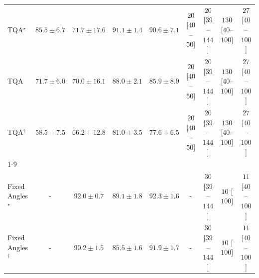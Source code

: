 \begin{tabular}{l|cccc|cccc|}
TQA$^\star$ & {\cellcolor[HTML]{C84A02}} \color[HTML]{F1F1F1} $85.5\pm 6.7$ & {\cellcolor[HTML]{FEA937}} \color[HTML]{000000} $71.7\pm 17.6$ & {\cellcolor[HTML]{963304}} \color[HTML]{F1F1F1} $91.1\pm 1.4$ & {\cellcolor[HTML]{9B3504}} \color[HTML]{F1F1F1} $90.6\pm 7.1$ & {\cellcolor[HTML]{FFF4F0}} \color[HTML]{000000} $20$ [$40$--$50$] & {\cellcolor[HTML]{FFF4F0}} \color[HTML]{000000} $20$ [$39$--$144$] & {\cellcolor[HTML]{FDD9D6}} \color[HTML]{000000} $130$ [$40$--$100$] & {\cellcolor[HTML]{FFF3EF}} \color[HTML]{000000} $27$ [$40$--$100$] \\
TQA & {\cellcolor[HTML]{FEA937}} \color[HTML]{000000} $71.7\pm 6.0$ & {\cellcolor[HTML]{FEB541}} \color[HTML]{000000} $70.0\pm 16.1$ & {\cellcolor[HTML]{B13F03}} \color[HTML]{F1F1F1} $88.0\pm 2.1$ & {\cellcolor[HTML]{C44802}} \color[HTML]{F1F1F1} $85.9\pm 8.9$ & {\cellcolor[HTML]{FFF4F0}} \color[HTML]{000000} $20$ [$40$--$50$] & {\cellcolor[HTML]{FFF4F0}} \color[HTML]{000000} $20$ [$39$--$144$] & {\cellcolor[HTML]{FDD9D6}} \color[HTML]{000000} $130$ [$40$--$100$] & {\cellcolor[HTML]{FFF3EF}} \color[HTML]{000000} $27$ [$40$--$100$] \\
TQA$^\dagger$ & {\cellcolor[HTML]{FFF1AE}} \color[HTML]{000000} $58.5\pm 7.5$ & {\cellcolor[HTML]{FECE65}} \color[HTML]{000000} $66.2\pm 12.8$ & {\cellcolor[HTML]{E3660F}} \color[HTML]{F1F1F1} $81.0\pm 3.5$ & {\cellcolor[HTML]{F27D1B}} \color[HTML]{F1F1F1} $77.6\pm 6.5$ & {\cellcolor[HTML]{FFF4F0}} \color[HTML]{000000} $20$ [$40$--$50$] & {\cellcolor[HTML]{FFF4F0}} \color[HTML]{000000} $20$ [$39$--$144$] & {\cellcolor[HTML]{FDD9D6}} \color[HTML]{000000} $130$ [$40$--$100$] & {\cellcolor[HTML]{FFF3EF}} \color[HTML]{000000} $27$ [$40$--$100$] \\
\cline{1-9}
\multicolumn{9}{c}{\rule{0pt}{8pt}PP} \\
\midrule
Fixed Angles$^\star$ & {\cellcolor[HTML]{000000}} \color[HTML]{F1F1F1} {\cellcolor{white}} \color{black} - & {\cellcolor[HTML]{006034}} \color[HTML]{F1F1F1} $92.0\pm 0.7$ & {\cellcolor[HTML]{0A703A}} \color[HTML]{F1F1F1} $89.1\pm 1.8$ & {\cellcolor[HTML]{005E33}} \color[HTML]{F1F1F1} $92.3\pm 1.6$ & {\cellcolor[HTML]{000000}} \color[HTML]{F1F1F1} {\cellcolor{white}} \color{black} - & {\cellcolor[HTML]{FFF2EE}} \color[HTML]{000000} $30$ [$39$--$144$] & {\cellcolor[HTML]{FFF7F3}} \color[HTML]{000000} $10$ [$100$] & {\cellcolor[HTML]{FFF6F2}} \color[HTML]{000000} $11$ [$40$--$100$] \\
Fixed Angles$^\dagger$ & {\cellcolor[HTML]{000000}} \color[HTML]{F1F1F1} {\cellcolor{white}} \color{black} - & {\cellcolor[HTML]{036B38}} \color[HTML]{F1F1F1} $90.2\pm 1.5$ & {\cellcolor[HTML]{208242}} \color[HTML]{F1F1F1} $85.5\pm 1.6$ & {\cellcolor[HTML]{006034}} \color[HTML]{F1F1F1} $91.9\pm 1.7$ & {\cellcolor[HTML]{000000}} \color[HTML]{F1F1F1} {\cellcolor{white}} \color{black} - & {\cellcolor[HTML]{FFF2EE}} \color[HTML]{000000} $30$ [$39$--$144$] & {\cellcolor[HTML]{FFF7F3}} \color[HTML]{000000} $10$ [$100$] & {\cellcolor[HTML]{FFF6F2}} \color[HTML]{000000} $11$ [$40$--$100$] \\

\end{tabular}

